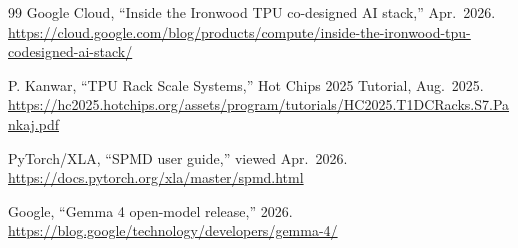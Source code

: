 \documentclass[conference]{IEEEtran}
\begin{document}
\begin{thebibliography}{99}
 Google Cloud, ``Inside the Ironwood TPU
co-designed AI stack,'' Apr.\ 2026.
\url{https://cloud.google.com/blog/products/compute/inside-the-ironwood-tpu-codesigned-ai-stack/}

 P. Kanwar, ``TPU Rack Scale
Systems,'' Hot Chips 2025 Tutorial, Aug.\ 2025.
\url{https://hc2025.hotchips.org/assets/program/tutorials/HC2025.T1DCRacks.S7.Pankaj.pdf}

 PyTorch/XLA, ``SPMD user guide,'' viewed
Apr.\ 2026.
\url{https://docs.pytorch.org/xla/master/spmd.html}

 Google, ``Gemma 4 open-model release,''
2026. \url{https://blog.google/technology/developers/gemma-4/}

\end{thebibliography}
\end{document}
